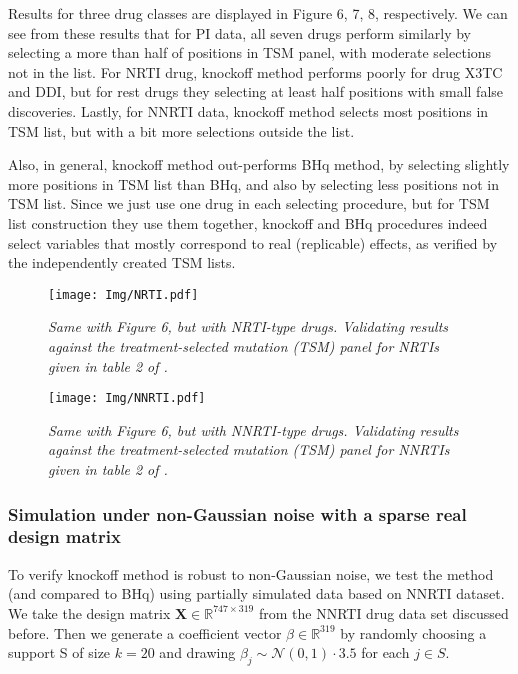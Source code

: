 \documentclass{uwstat572}
\begin{document}
Results for three drug classes are displayed in Figure 6, 7, 8, respectively. We can see from these results that for PI data, all seven drugs perform similarly by selecting a more than half of positions in TSM panel, with moderate selections not in the list. For NRTI drug, knockoff method performs poorly for drug X3TC and DDI, but for rest drugs they selecting at least half positions with small false discoveries. Lastly, for NNRTI data, knockoff method selects most positions in TSM list, but with a bit more selections outside the list.

Also, in general, knockoff method out-performs BHq method, by selecting slightly more positions in TSM list than BHq, and also by selecting less positions not in TSM list. Since we just use one drug in each selecting procedure, but for TSM list construction they use them together, knockoff and BHq procedures indeed select variables that mostly correspond to real (replicable) effects, as verified by the independently created TSM lists.

\begin{figure}\label{Fig:7}
	\centering\texttt{[image: Img/NRTI.pdf]}
	\caption{{\it Same with Figure 6, but with NRTI-type drugs. Validating results against the treatment-selected mutation (TSM) panel for NRTIs given in table 2 of \cite{rhee2005hiv}.}}
\end{figure} 


\begin{figure}\label{Fig:8}
	\centering\texttt{[image: Img/NNRTI.pdf]}
	\caption{{\it Same with Figure 6, but with NNRTI-type drugs. Validating results against the treatment-selected mutation (TSM) panel for NNRTIs given in table 2 of \cite{rhee2005hiv}.}}
\end{figure} 

\subsubsection{Simulation under non-Gaussian noise with a sparse real design matrix}
To verify knockoff method is robust to non-Gaussian noise, we test the method (and compared to BHq) using partially simulated data based on NNRTI dataset. We take the design matrix $\bm{X} \in \mathbb{R}^{747\times 319}$ from the NNRTI drug data set discussed before. Then we generate a coefficient vector $\beta\in\mathbb{R}^{319}$ by randomly choosing a support S of size $k=20$ and drawing $\beta_j\sim\mathcal{N}(0,1) \cdot 3.5$ for each $j\in S$.
\end{document}
